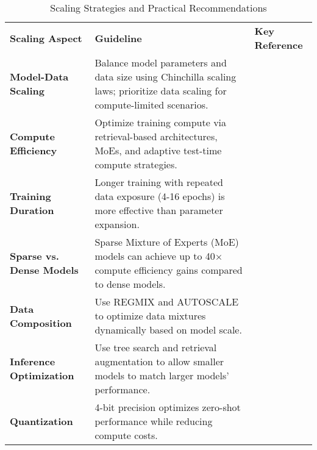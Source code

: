\begin{table*}[h]
   \centering
   \begin{tabular}{|p{4cm}|p{6cm}|p{4cm}|}
       \cline{1-3}
       \textbf{Scaling Aspect} & \textbf{Guideline} & \textbf{Key Reference} \\
       \cline{1-3}
       \textbf{Model-Data Scaling} & Balance model parameters and data size using Chinchilla scaling laws; prioritize data scaling for compute-limited scenarios. & \citep{hoffmann_training_2022} \\
       \cline{1-3}
       \textbf{Compute Efficiency} & Optimize training compute via retrieval-based architectures, MoEs, and adaptive test-time compute strategies. & \citep{brown_large_2024} \\
       \cline{1-3}
       \textbf{Training Duration} & Longer training with repeated data exposure (4-16 epochs) is more effective than parameter expansion. & \citep{muennighoff_scaling_2023} \\
       \cline{1-3}
       \textbf{Sparse vs. Dense Models} & Sparse Mixture of Experts (MoE) models can achieve up to 40× compute efficiency gains compared to dense models. & \citep{krajewski_scaling_2024} \\
       \cline{1-3}
       \textbf{Data Composition} & Use REGMIX and AUTOSCALE to optimize data mixtures dynamically based on model scale. & \citep{liu_regmix:_2024, kang_autoscale:_2024} \\
       \cline{1-3}
       \textbf{Inference Optimization} & Use tree search and retrieval augmentation to allow smaller models to match larger models’ performance. & \citep{wu_inference_2024} \\
       \cline{1-3}
       \textbf{Quantization} & 4-bit precision optimizes zero-shot performance while reducing compute costs. & \citep{dettmers_case_2023} \\
       \cline{1-3}
   \end{tabular}
   \label{tab:scaling_guidelines}
      \caption{Scaling Strategies and Practical Recommendations}
\end{table*}